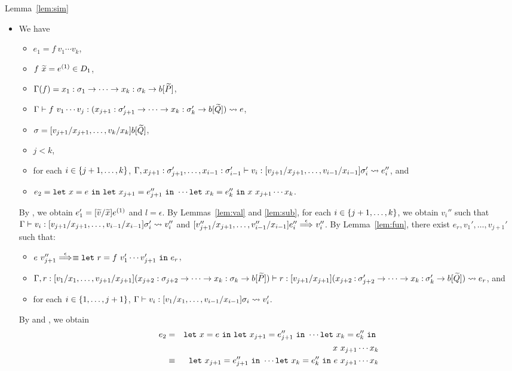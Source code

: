 \begin{pfof}{Lemma~\ref{lem:sim}}
\begin{itemize}
\item[] 
We have
\begin{itemize}
\item \(e_1=f\ v_1\cdots v_k\),
\item \(f\ \widetilde{x}=e^{(1)} \in D_1\),
\item \(\Gamma(f)=x_1:\sigma_1 \to \cdots \to x_k:\sigma_k \to b[\widetilde{P}]\),
\item \(\Gamma \vdash f\ v_1\cdots v_j : (x_{j+1}:\sigma_{j+1}' \to \cdots \to x_k:\sigma_k' \to b[\widetilde{Q}]) \leadsto e\),
\item \(\sigma=[v_{j+1}/x_{j+1},\dots,v_k/x_k]b[\widetilde{Q}]\),
\item \(j<k\),
\item for each \(i \in \{j+1,\dots,k\}\), \(\Gamma,x_{j+1}:\sigma_{j+1}',\dots,x_{i-1}:\sigma_{i-1}' \vdash v_i : [v_{j+1}/x_{j+1},\dots,v_{i-1}/x_{i-1}]\sigma_i' \leadsto e_i''\), and
\item \(e_2=\mathtt{let~}x=e\mathtt{~in~}\mathtt{let~}x_{j+1}=e_{j+1}''\mathtt{~in~}\cdots\mathtt{let~}x_k=e_k''\mathtt{~in~}x\ x_{j+1}\cdots x_k\).
\end{itemize}
%
By , we obtain
\(e_1'=[\widetilde{v}/\widetilde{x}]e^{(1)}\) and \(l=\epsilon\).
%
By Lemmas~\ref{lem:val} and \ref{lem:sub}, for each \(i \in \{j+1,\dots,k\}\), we obtain \(v_i''\) such that
\(\Gamma \vdash v_i : [v_{j+1}/x_{j+1},\dots,v_{i-1}/x_{i-1}]\sigma_i' \leadsto v_i''\) and
\([v_{j+1}''/x_{j+1},\dots,v_{i-1}''/x_{i-1}]e_i'' \stackrel{\epsilon}{\Longrightarrow}_{} v_i''\).
%
By Lemma~\ref{lem:fun}, there exist \(e_r,v_1',\dots,v_{j+1}'\) such that:
\begin{itemize}
\item \(e\ v_{j+1}'' \stackrel{\epsilon}{\Longrightarrow}_{}\equiv \mathtt{let~}r=f\ v_1'\cdots v_{j+1}'\mathtt{~in~}{e_r}\),
\item
\(\Gamma,r:[v_1/x_1,\dots,v_{j+1}/x_{j+1}](x_{j+2}:\sigma_{j+2} \to \cdots \to x_k:\sigma_k \to b[\widetilde{P}]) \vdash r : [v_{j+1}/x_{j+1}](x_{j+2}\mathbin{:}\sigma_{j+2}' \to \cdots \to x_k\mathbin{:}\sigma_k' \to b[\widetilde{Q}]) \leadsto e_r\), and
\item for each \(i \in \{1,\dots,j+1\}\), \(\Gamma \vdash v_i : [v_1/x_1,\dots,v_{i-1}/x_{i-1}]\sigma_i \leadsto v_i'\).
\end{itemize}
%
By  and , we obtain
\begin{eqnarray*}
e_2&=&\LETEQIN{x}{e}\LETEQIN{x_{j+1}}{e_{j+1}''}\cdots\LETEQIN{x_k}{e_k''} \\
&&x\ x_{j+1}\cdots x_k \\
&\equiv&\LETEQIN{x_{j+1}}{e_{j+1}''}\cdots\LETEQIN{x_k}{e_k''}e\ x_{j+1}\cdots x_k \\

\end{eqnarray*}
\end{itemize}
\end{pfof}
